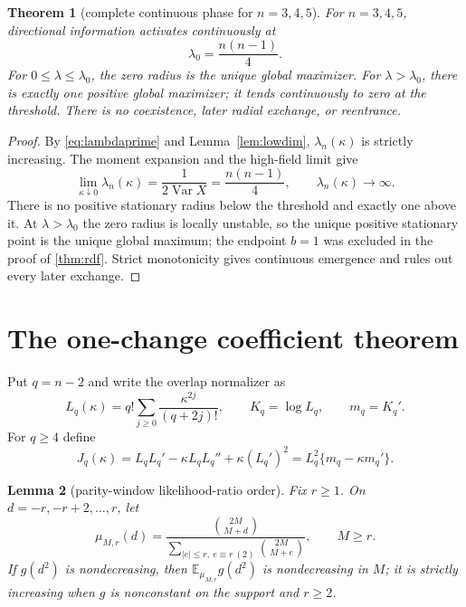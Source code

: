 \documentclass[11pt,a4paper]{article}
\newtheorem{theorem}{Theorem}[section]
\newtheorem{lemma}[theorem]{Lemma}
\newcommand{\E}{\mathbb E}
\DeclareMathOperator{\Var}{Var}
\begin{document}
\begin{theorem}[complete continuous phase for $n=3,4,5$]\label{thm:lowphase}
For $n=3,4,5$, directional information activates continuously at
\[
 \lambda_0=\frac{n(n-1)}4.
\]
For $0\le\lambda\le\lambda_0$, the zero radius is the unique global
maximizer.  For $\lambda>\lambda_0$, there is exactly one positive global
maximizer; it tends continuously to zero at the threshold.  There is no
coexistence, later radial exchange, or reentrance.
\end{theorem}

\begin{proof}
By \cref{eq:lambdaprime} and Lemma~\ref{lem:lowdim}, $\lambda_n(\kappa)$ is strictly
increasing.  The moment expansion and the high-field limit give
\[
 \lim_{\kappa\downarrow0}\lambda_n(\kappa)
 =\frac1{2\Var X}=\frac{n(n-1)}4,
 \qquad \lambda_n(\kappa)\longrightarrow\infty.
\]
There is no positive stationary radius below the threshold and exactly one
above it.  At $\lambda>\lambda_0$ the zero radius is locally unstable, so the
unique positive stationary point is the unique global maximum; the endpoint
$b=1$ was excluded in the proof of \cref{thm:rdf}.  Strict monotonicity gives
continuous emergence and rules out every later exchange.
\end{proof}

\section{The one-change coefficient theorem}\label{sec:onechange}

Put $q=n-2$ and write the overlap normalizer as
\begin{equation}\label{eq:Lseriesq}
 L_q(\kappa)=q!\sum_{j\ge0}\frac{\kappa^{2j}}{(q+2j)!},
 \qquad K_q=\log L_q,\qquad m_q=K_q'.
\end{equation}
For $q\ge4$ define
\begin{equation}\label{eq:Jdef}
 J_q(\kappa)=L_qL_q'-\kappa L_qL_q''
              +\kappa(L_q')^2
 =L_q^2\{m_q-\kappa m_q'\}.
\end{equation}

\begin{lemma}[parity-window likelihood-ratio order]\label{lem:parity-mlr}
Fix $r\ge1$.  On $d=-r,-r+2,\ldots,r$, let
\[
 \mu_{M,r}(d)=
 \frac{\binom{2M}{M+d}}
 {\sum_{|e|\le r,\ e\equiv r\ (2)}\binom{2M}{M+e}},
 \qquad M\ge r.
\]
If $g(d^2)$ is nondecreasing, then
$\E_{\mu_{M,r}}g(d^2)$ is nondecreasing in $M$; it is strictly increasing
when $g$ is nonconstant on the support and $r\ge2$.
\end{lemma}
\end{document}
